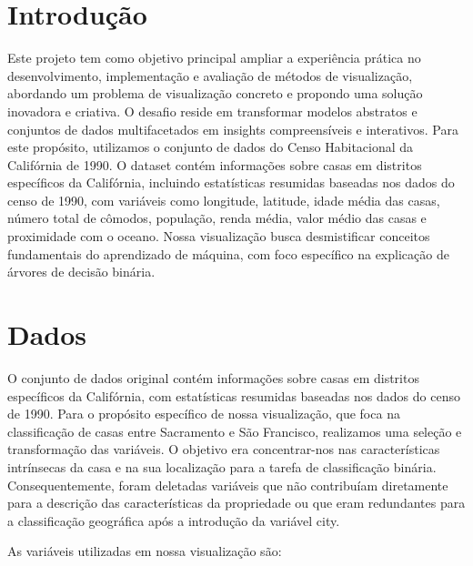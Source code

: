 \documentclass{article}
\begin{document}
\tableofcontents

\newpage


\section{Introdução}

Este projeto tem como objetivo principal ampliar a experiência prática no desenvolvimento, 
implementação e avaliação de métodos de visualização, abordando um problema de visualização 
concreto e propondo uma solução inovadora e criativa. O desafio reside em transformar modelos abstratos e conjuntos 
de dados multifacetados em insights compreensíveis e interativos.
Para este propósito, utilizamos o conjunto de dados do Censo Habitacional da Califórnia de 
1990. O dataset contém informações sobre casas em distritos específicos da Califórnia, 
incluindo estatísticas resumidas baseadas nos dados do censo de 1990, com variáveis como 
longitude, latitude, idade média das casas, número total de cômodos, população, renda média, 
valor médio das casas e proximidade com o oceano.
Nossa visualização busca desmistificar conceitos fundamentais do aprendizado de máquina, 
com foco específico na explicação de árvores de decisão binária.

\section{Dados}

O conjunto de dados original contém informações sobre casas em distritos específicos da Califórnia, 
com estatísticas resumidas baseadas nos dados do censo de 1990. Para o propósito específico de nossa 
visualização, que foca na classificação de casas entre Sacramento e São Francisco, realizamos uma seleção 
e transformação das variáveis. O objetivo era concentrar-nos nas 
características intrínsecas da casa e na sua localização para a tarefa de classificação binária. Consequentemente, 
foram deletadas variáveis que não contribuíam diretamente para a descrição das características da propriedade 
ou que eram redundantes para a classificação geográfica após a introdução da variável city.

As variáveis utilizadas em nossa visualização são:
\end{document}
